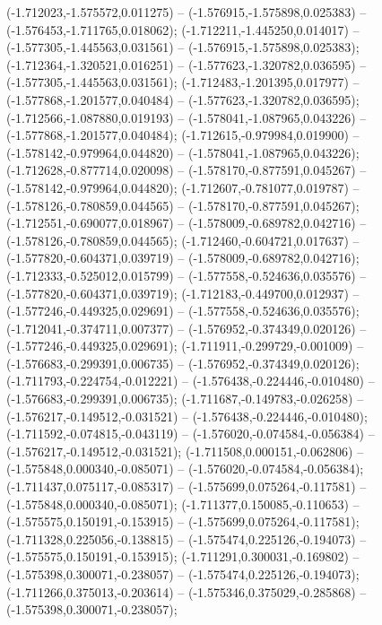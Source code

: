  (-1.712023,-1.575572,0.011275) -- (-1.576915,-1.575898,0.025383) -- (-1.576453,-1.711765,0.018062);
 (-1.712211,-1.445250,0.014017) -- (-1.577305,-1.445563,0.031561) -- (-1.576915,-1.575898,0.025383);
 (-1.712364,-1.320521,0.016251) -- (-1.577623,-1.320782,0.036595) -- (-1.577305,-1.445563,0.031561);
 (-1.712483,-1.201395,0.017977) -- (-1.577868,-1.201577,0.040484) -- (-1.577623,-1.320782,0.036595);
 (-1.712566,-1.087880,0.019193) -- (-1.578041,-1.087965,0.043226) -- (-1.577868,-1.201577,0.040484);
 (-1.712615,-0.979984,0.019900) -- (-1.578142,-0.979964,0.044820) -- (-1.578041,-1.087965,0.043226);
 (-1.712628,-0.877714,0.020098) -- (-1.578170,-0.877591,0.045267) -- (-1.578142,-0.979964,0.044820);
 (-1.712607,-0.781077,0.019787) -- (-1.578126,-0.780859,0.044565) -- (-1.578170,-0.877591,0.045267);
 (-1.712551,-0.690077,0.018967) -- (-1.578009,-0.689782,0.042716) -- (-1.578126,-0.780859,0.044565);
 (-1.712460,-0.604721,0.017637) -- (-1.577820,-0.604371,0.039719) -- (-1.578009,-0.689782,0.042716);
 (-1.712333,-0.525012,0.015799) -- (-1.577558,-0.524636,0.035576) -- (-1.577820,-0.604371,0.039719);
 (-1.712183,-0.449700,0.012937) -- (-1.577246,-0.449325,0.029691) -- (-1.577558,-0.524636,0.035576);
 (-1.712041,-0.374711,0.007377) -- (-1.576952,-0.374349,0.020126) -- (-1.577246,-0.449325,0.029691);
 (-1.711911,-0.299729,-0.001009) -- (-1.576683,-0.299391,0.006735) -- (-1.576952,-0.374349,0.020126);
 (-1.711793,-0.224754,-0.012221) -- (-1.576438,-0.224446,-0.010480) -- (-1.576683,-0.299391,0.006735);
 (-1.711687,-0.149783,-0.026258) -- (-1.576217,-0.149512,-0.031521) -- (-1.576438,-0.224446,-0.010480);
 (-1.711592,-0.074815,-0.043119) -- (-1.576020,-0.074584,-0.056384) -- (-1.576217,-0.149512,-0.031521);
 (-1.711508,0.000151,-0.062806) -- (-1.575848,0.000340,-0.085071) -- (-1.576020,-0.074584,-0.056384);
 (-1.711437,0.075117,-0.085317) -- (-1.575699,0.075264,-0.117581) -- (-1.575848,0.000340,-0.085071);
 (-1.711377,0.150085,-0.110653) -- (-1.575575,0.150191,-0.153915) -- (-1.575699,0.075264,-0.117581);
 (-1.711328,0.225056,-0.138815) -- (-1.575474,0.225126,-0.194073) -- (-1.575575,0.150191,-0.153915);
 (-1.711291,0.300031,-0.169802) -- (-1.575398,0.300071,-0.238057) -- (-1.575474,0.225126,-0.194073);
 (-1.711266,0.375013,-0.203614) -- (-1.575346,0.375029,-0.285868) -- (-1.575398,0.300071,-0.238057);
